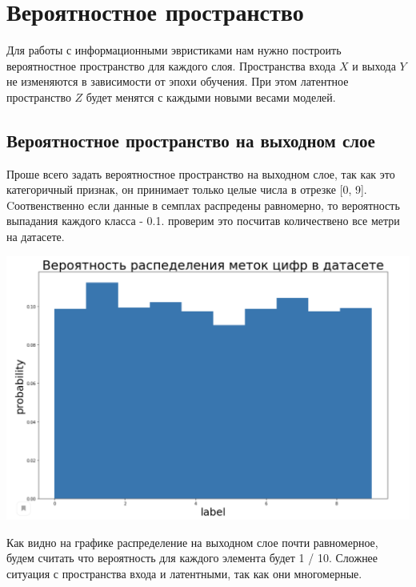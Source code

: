 \section{Вероятностное пространство}

Для работы с информационными эвристиками нам нужно построить вероятностное пространство для каждого слоя. Пространства входа $X$ и выхода $Y$ не изменяются в зависимости от эпохи обучения. При этом латентное пространство $Z$ будет менятся с каждыми новыми весами моделей. \\
\subsection{Вероятностное пространство на выходном слое}
Проше всего задать вероятностное пространство на выходном слое, так как это категоричный признак, он принимает только целые числа в отрезке [0, 9]. Cоотвенственно если данные в семплах распредены равномерно, то вероятность выпадания каждого класса - 0.1. проверим это посчитав количествено все метри на датасете.
\begin{center}
    \includegraphics[scale=0.4]{images/y_prob.png}
\end{center}
Как видно на графике распределение на выходном слое почти равномерное, будем считать что вероятность для каждого элемента будет 1 / 10.
Сложнее ситуация с пространства входа и латентными, так как они многомерные.
